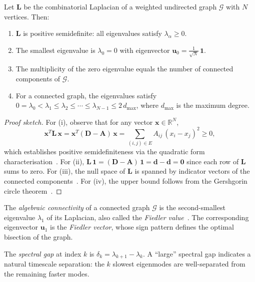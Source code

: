 \begin{theorem}
\label{thm:spectral}
Let $\mathbf{L}$ be the combinatorial Laplacian of a weighted undirected
graph $\mathcal{G}$ with $N$ vertices.  Then:
\begin{enumerate}[label=(\roman*)]
    \item $\mathbf{L}$ is positive semidefinite: all eigenvalues satisfy
    $\lambda_\alpha \geq 0$.
    \item The smallest eigenvalue is $\lambda_0 = 0$ with eigenvector
    $\mathbf{u}_0 = \frac{1}{\sqrt{N}}\,\mathbf{1}$.
    \item The multiplicity of the zero eigenvalue equals the number of
    connected components of $\mathcal{G}$.
    \item For a connected graph, the eigenvalues satisfy
    $0 = \lambda_0 < \lambda_1 \leq \lambda_2 \leq \cdots \leq
    \lambda_{N-1} \leq 2\,d_{\max}$, where $d_{\max}$ is the maximum
    degree.
\end{enumerate}
\end{theorem}

\begin{proof}[Proof sketch]
For (i), observe that for any vector $\mathbf{x} \in \mathbb{R}^N$,
\begin{equation}
\mathbf{x}^T \mathbf{L}\, \mathbf{x}
= \mathbf{x}^T (\mathbf{D} - \mathbf{A})\, \mathbf{x}
= \sum_{(i,j) \in E} A_{ij}\,(x_i - x_j)^2
\geq 0,
\label{eq:psd_proof}
\end{equation}
which establishes positive semidefiniteness via the quadratic form
characterisation~\cite{chung1997spectral}.  For (ii), $\mathbf{L}\,
\mathbf{1} = (\mathbf{D} - \mathbf{A})\,\mathbf{1} = \mathbf{d} -
\mathbf{d} = \mathbf{0}$ since each row of $\mathbf{L}$ sums to zero.
For (iii), the null space of $\mathbf{L}$ is spanned by indicator
vectors of the connected components~\cite{cvetkovic1995spectra}.  For
(iv), the upper bound follows from the Gershgorin circle
theorem~\cite{golub2013matrix}.
\end{proof}

\begin{definition}
\label{def:algebraic_connectivity}
The \emph{algebraic connectivity} of a connected graph $\mathcal{G}$ is
the second-smallest eigenvalue $\lambda_1$ of its Laplacian, also called
the \emph{Fiedler value}~\cite{fiedler1973algebraic}.  The corresponding
eigenvector $\mathbf{u}_1$ is the \emph{Fiedler vector}, whose sign
pattern defines the optimal bisection of the graph.

The \emph{spectral gap} at index $k$ is $\delta_k = \lambda_{k+1} -
\lambda_k$.  A ``large'' spectral gap indicates a natural timescale
separation: the $k$ slowest eigenmodes are well-separated from the
remaining faster modes.
\end{definition}

